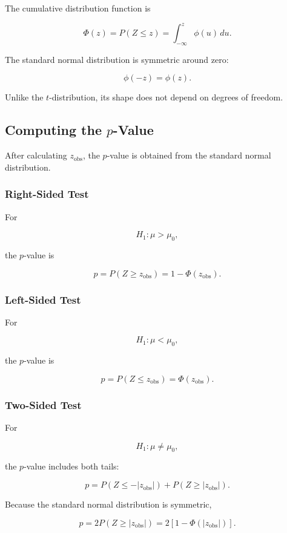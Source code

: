 \documentclass[11pt]{article}
\begin{document}
The cumulative distribution function is

\[
\Phi(z)
=
P(Z\leq z)
=
\int_{-\infty}^{z}\phi(u)\,du.
\]

The standard normal distribution is symmetric around zero:

\[
\phi(-z)=\phi(z).
\]

Unlike the \(t\)-distribution, its shape does not depend on degrees of
freedom.

\subsection{Computing the \(p\)-Value}

After calculating \(z_{\mathrm{obs}}\), the \(p\)-value is obtained from
the standard normal distribution.

\subsubsection{Right-Sided Test}

For

\[
H_1:\mu>\mu_0,
\]

the \(p\)-value is

\[
p=P(Z\geq z_{\mathrm{obs}})
=1-\Phi(z_{\mathrm{obs}}).
\]

\subsubsection{Left-Sided Test}

For

\[
H_1:\mu<\mu_0,
\]

the \(p\)-value is

\[
p=P(Z\leq z_{\mathrm{obs}})
=\Phi(z_{\mathrm{obs}}).
\]

\subsubsection{Two-Sided Test}

For

\[
H_1:\mu\neq\mu_0,
\]

the \(p\)-value includes both tails:

\[
p
=
P(Z\leq-|z_{\mathrm{obs}}|)
+
P(Z\geq|z_{\mathrm{obs}}|).
\]

Because the standard normal distribution is symmetric,

\[
\boxed{
p
=
2P(Z\geq|z_{\mathrm{obs}}|)
=
2\left[1-\Phi(|z_{\mathrm{obs}}|)\right]
}.
\]
\end{document}
